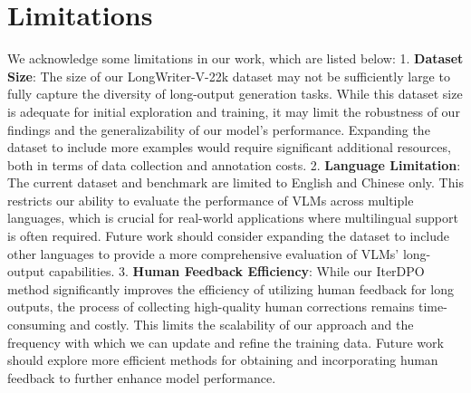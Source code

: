 \section*{Limitations}
We acknowledge some limitations in our work, which are listed below:
1. \textbf{Dataset Size}: The size of our LongWriter-V-22k dataset may not be sufficiently large to fully capture the diversity of long-output generation tasks. While this dataset size is adequate for initial exploration and training, it may limit the robustness of our findings and the generalizability of our model's performance. Expanding the dataset to include more examples would require significant additional resources, both in terms of data collection and annotation costs.
2. \textbf{Language Limitation}: The current dataset and benchmark are limited to English and Chinese only. This restricts our ability to evaluate the performance of VLMs across multiple languages, which is crucial for real-world applications where multilingual support is often required. Future work should consider expanding the dataset to include other languages to provide a more comprehensive evaluation of VLMs' long-output capabilities. 
3. \textbf{Human Feedback Efficiency}: While our IterDPO method significantly improves the efficiency of utilizing human feedback for long outputs, the process of collecting high-quality human corrections remains time-consuming and costly. This limits the scalability of our approach and the frequency with which we can update and refine the training data. Future work should explore more efficient methods for obtaining and incorporating human feedback to further enhance model performance.
